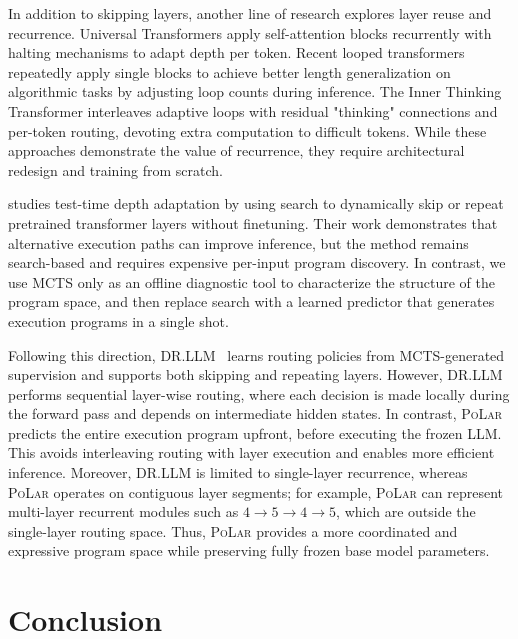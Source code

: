 \documentclass{article}
\theoremstyle{plain}
\theoremstyle{definition}
\theoremstyle{remark}
\newcommand\ours{\textsc{PoLar}\xspace}
\begin{document}
In addition to skipping layers, another line of research explores layer reuse and recurrence. Universal Transformers \cite{dehghani2018universal} apply self-attention blocks recurrently with halting mechanisms to adapt depth per token. Recent looped transformers \cite{fan2024looped,yang2023looped} repeatedly apply single blocks to achieve better length generalization on algorithmic tasks by adjusting loop counts during inference. The Inner Thinking Transformer \cite{chen2025inner} interleaves adaptive loops with residual "thinking" connections and per-token routing, devoting extra computation to difficult tokens. While these approaches demonstrate the value of recurrence, they require architectural redesign and training from scratch.

\citet{li2025skip} studies test-time depth adaptation by using search to
dynamically skip or repeat pretrained transformer layers without finetuning.
Their work demonstrates that alternative execution paths can improve inference,
but the method remains search-based and requires expensive per-input program
discovery. In contrast, we use MCTS only as an offline diagnostic tool to
characterize the structure of the program space, and then replace search with
a learned predictor that generates execution programs in a single shot.

Following this direction, DR.LLM~\cite{heakl2025dr} learns routing policies
from MCTS-generated supervision and supports both skipping and repeating layers.
However, DR.LLM performs sequential layer-wise routing, where each decision is
made locally during the forward pass and depends on intermediate hidden states.
In contrast, \ours predicts the entire execution program upfront, before
executing the frozen LLM. This avoids interleaving routing with layer execution
and enables more efficient inference. Moreover, DR.LLM is limited to
single-layer recurrence, whereas \ours operates on contiguous layer segments;
for example, \ours can represent multi-layer recurrent modules such as
$4{\rightarrow}5{\rightarrow}4{\rightarrow}5$, which are outside the
single-layer routing space. Thus, \ours provides a more coordinated and
expressive program space while preserving fully frozen base model parameters.

\section{Conclusion}
\end{document}
